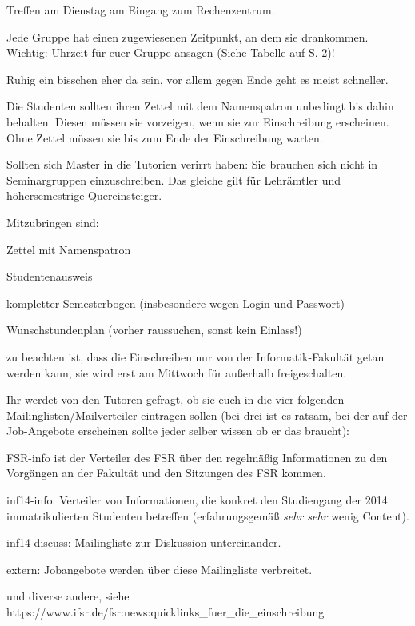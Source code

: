 \documentclass[a4paper,12pt]{report}
\begin{document}
\begin{itemize*}
	\item Treffen am Dienstag am Eingang zum Rechenzentrum.
	\item Jede Gruppe hat einen zugewiesenen Zeitpunkt, an dem sie drankommen. Wichtig: Uhrzeit für euer Gruppe ansagen (Siehe Tabelle auf S. 2)!
	\item Ruhig ein bisschen eher da sein, vor allem gegen Ende geht es meist schneller.
	\item Die Studenten sollten ihren Zettel mit dem Namenspatron unbedingt bis dahin behalten.
	Diesen müssen sie vorzeigen, wenn sie zur Einschreibung erscheinen. Ohne Zettel müssen sie bis zum Ende der Einschreibung warten.
	\item Sollten sich Master in die Tutorien verirrt haben:
	Sie brauchen sich nicht in Seminargruppen einzuschreiben.
	Das gleiche gilt für Lehrämtler und höhersemestrige Quereinsteiger.
	\item Mitzubringen sind:
		\begin{itemize*}
		\item Zettel mit Namenspatron
		\item Studentenausweis
		\item kompletter Semesterbogen (insbesondere wegen Login und Passwort)
		\item Wunschstundenplan (vorher raussuchen, sonst kein Einlass!)
		\item zu beachten ist, dass die Einschreiben nur von der Informatik-Fakultät getan werden kann, sie wird erst am Mittwoch für außerhalb freigeschalten.
	\end{itemize*}
	\item Ihr werdet von den Tutoren gefragt, ob sie euch in die vier folgenden Mailinglisten/Mailverteiler eintragen sollen (bei drei ist es ratsam, bei der auf der Job-Angebote erscheinen sollte jeder selber wissen ob er das braucht):
		\begin{itemize*}
		\item FSR-info ist der Verteiler des FSR über den regelmäßig Informationen zu den Vorgängen an der Fakultät und den Sitzungen des FSR kommen.
		\item inf14-info: Verteiler von Informationen, die konkret den Studiengang der 2014 immatrikulierten Studenten betreffen (erfahrungsgemäß \textit{sehr sehr} wenig Content).
		\item inf14-discuss: Mailingliste zur Diskussion untereinander.
		\item extern: Jobangebote werden über diese Mailingliste verbreitet.
		\item und diverse andere, siehe \\ https://www.ifsr.de/fsr:news:quicklinks\_fuer\_die\_einschreibung
	\end{itemize*}
\end{itemize*}
\end{document}
